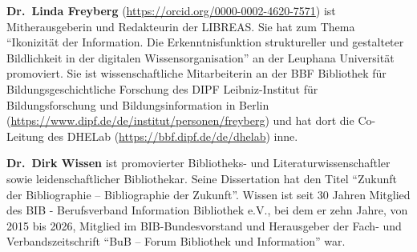 \documentclass[a4paper,
fontsize=11pt,
oneside,
numbers=noperiodatend,
parskip=half-,
bibliography=totoc,
final
]{scrartcl}
\begin{document}
\textbf{Dr.~Linda Freyberg}
(\url{https://orcid.org/0000-0002-4620-7571}) ist Mitherausgeberin und
Redakteurin der LIBREAS. Sie hat zum Thema \enquote{Ikonizität der Information.
Die Erkenntnisfunktion struktureller und gestalteter Bildlichkeit in der
digitalen Wissensorganisation} an der Leuphana Universität promoviert.
Sie ist wissenschaftliche Mitarbeiterin an der BBF \textbar{} Bibliothek
für Bildungsgeschichtliche Forschung des DIPF \textbar{}
Leibniz-Institut für Bildungsforschung und Bildungsinformation in Berlin
(\url{https://www.dipf.de/de/institut/personen/freyberg}) und hat dort
die Co-Leitung des DHELab (\url{https://bbf.dipf.de/de/dhelab}) inne.

\textbf{Dr.~Dirk Wissen} ist promovierter Bibliotheks- und
Literaturwissenschaftler sowie leidenschaftlicher Bibliothekar. Seine
Dissertation hat den Titel \enquote{Zukunft der Bibliographie -- Bibliographie
der Zukunft}. Wissen ist seit 30 Jahren Mitglied des BIB -
Berufsverband Information Bibliothek e.V., bei dem er zehn Jahre, von
2015 bis 2026, Mitglied im BIB-Bundesvorstand und Herausgeber der Fach-
und Verbandszeitschrift \enquote{BuB -- Forum Bibliothek und Information} war.
\end{document}
